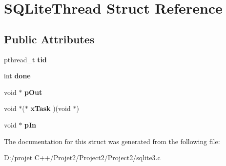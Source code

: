 \hypertarget{struct_s_q_lite_thread}{}\section{S\+Q\+Lite\+Thread Struct Reference}
\label{struct_s_q_lite_thread}
\subsection*{Public Attributes}
\begin{DoxyCompactItemize}
\item 
\mbox{\label{struct_s_q_lite_thread_a344b7b30ad7f54c6cbfb4d2378982610}} 
pthread\+\_\+t {\bfseries tid}
\item 
\mbox{\label{struct_s_q_lite_thread_af13ecbf8ad23f24a5074277cdcf0383b}} 
int {\bfseries done}
\item 
\mbox{\label{struct_s_q_lite_thread_aca6d94405a6e7eefb230cd08bf1ce71b}} 
void $\ast$ {\bfseries p\+Out}
\item 
\mbox{\label{struct_s_q_lite_thread_aadc8f1c225e769d42d981ae2e701d018}} 
void $\ast$($\ast$ {\bfseries x\+Task} )(void $\ast$)
\item 
\mbox{\label{struct_s_q_lite_thread_ad14ce51f32c66b80c515ec2338f6ccd2}} 
void $\ast$ {\bfseries p\+In}
\end{DoxyCompactItemize}


The documentation for this struct was generated from the following file\+:\begin{DoxyCompactItemize}
\item 
D\+:/projet C++/\+Projet2/\+Project2/\+Project2/sqlite3.\+c\end{DoxyCompactItemize}
